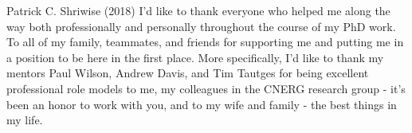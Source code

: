 


\begin{wbepi}{Patrick C. Shriwise (2018)}
I'd like to thank everyone who helped me along the way both
professionally and personally throughout the course of my PhD work. To
all of my family, teammates, and friends for supporting me and putting
me in a position to be here in the first place. More specifically, I'd
like to thank my mentors Paul Wilson, Andrew Davis, and Tim Tautges
for being excellent professional role models to me, my colleagues in the CNERG research
group - it's been an honor to work with you, and to my wife and family
- the best things in my life.
\end{wbepi}
